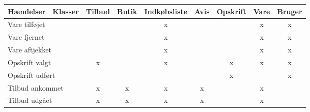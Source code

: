 \begin{table}[h]
\begin{tabular}{|l|l|c|c|c|c|c|c|c|}
\hline
Hændelser                  & Klasser                & \multicolumn{1}{l|}{Tilbud} & \multicolumn{1}{l|}{Butik} & \multicolumn{1}{l|}{Indkøbsliste} & \multicolumn{1}{l|}{Avis} & \multicolumn{1}{l|}{Opskrift} & \multicolumn{1}{l|}{Vare} & \multicolumn{1}{l|}{Bruger} \\ \hline
\multicolumn{2}{|l|}{Vare tilføjet}                 &                             &                            & x                                 &                           &                               & x                         & x                           \\ \hline
\multicolumn{2}{|l|}{Vare fjernet}                  &                             &                            & x                                 &                           &                               & x                         & x                           \\ \hline
\multicolumn{2}{|l|}{Vare aftjekket}                &                             &                            & x                                 &                           &                               & x                         & x                           \\ \hline
\multicolumn{2}{|l|}{Opskrift valgt}                & x                           &                            & x                                 &                           & x                             & x                         & x                           \\ \hline
\multicolumn{2}{|l|}{Opskrift udført}               &                             &                            &                                   &                           & x                             &                           & x                           \\ \hline
\multicolumn{2}{|l|}{Tilbud ankommet}               & x                           & x                          & x                                 & x                         &                               & x                         &                             \\ \hline
\multicolumn{2}{|l|}{Tilbud udgået}                 & x                           & x                          & x                                 & x                         &                               & x                         &                             \\ \hline

\end{tabular}
\end{table}
